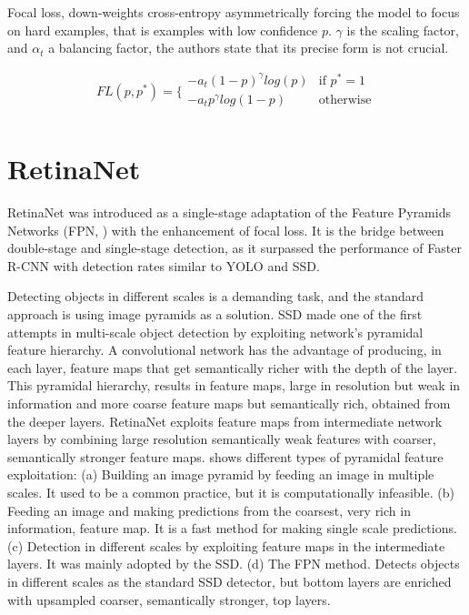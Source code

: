 Focal loss, down-weights cross-entropy asymmetrically forcing the model to focus on hard examples, that is examples with low confidence $p$. $\gamma$ is the scaling factor, and $\alpha_t$ a balancing factor, the authors state that its precise form is not crucial.

\begin{equation}
    FL(p,p^*)= \bigg\{
    \begin{array}{ll}
      -a_t(1-p)^\gamma log(p) & \text{if } p^*=1 \\
      -a_tp^\gamma log(1-p) &  \text{otherwise}\\
    \end{array}
\end{equation}

\section{RetinaNet}
RetinaNet was introduced as a single-stage adaptation of the Feature Pyramids Networks (FPN, \cite{lin2017feature}) with the enhancement of focal loss. It is the bridge between double-stage and single-stage detection, as it surpassed the performance of Faster R-CNN with detection rates similar to YOLO and SSD.

Detecting objects in different scales is a demanding task, and the standard approach is using image pyramids as a solution. SSD made one of the first attempts in multi-scale object detection by exploiting network's pyramidal feature hierarchy. A convolutional network has the advantage of producing, in each layer, feature maps that get semantically richer with the depth of the layer. This pyramidal hierarchy, results in feature maps, large in resolution but weak in information and more coarse feature maps but semantically rich, obtained from the deeper layers. RetinaNet exploits feature maps from intermediate network layers by combining large resolution semantically weak features with coarser, semantically stronger feature maps.  shows different types of pyramidal feature exploitation: (a) Building an image pyramid by feeding an image in multiple scales. It used to be a common practice, but it is computationally infeasible. (b) Feeding an image and making predictions from the coarsest, very rich in information, feature map. It is a fast method for making single scale predictions. (c) Detection in different scales by exploiting feature maps in the intermediate layers. It was mainly adopted by the SSD. (d) The FPN method. Detects objects in different scales as the standard SSD detector, but bottom layers are enriched with upsampled coarser, semantically stronger, top layers.

